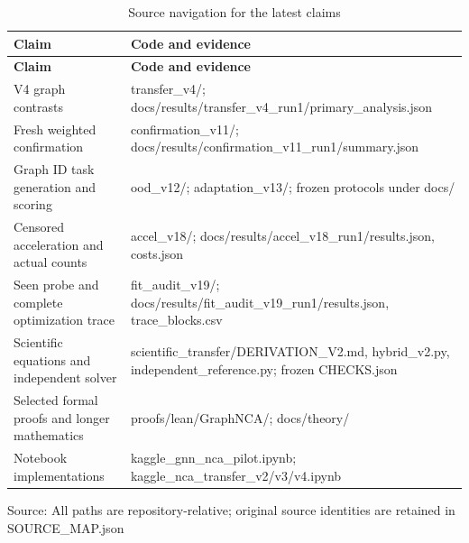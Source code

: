 \documentclass[10pt,letterpaper,twocolumn]{article}
\begin{document}
{\footnotesize\setlength{\tabcolsep}{4pt}\renewcommand{\arraystretch}{1.2}
\begin{longtable}{>{\raggedright\arraybackslash}p{}>{\raggedright\arraybackslash}p{}}
\caption{Source navigation for the latest claims}\\\toprule
\textbf{Claim} & \textbf{Code and evidence}\\
\midrule\endfirsthead
\toprule
\textbf{Claim} & \textbf{Code and evidence}\\
\midrule\endhead
\bottomrule\endlastfoot
V4 graph contrasts & transfer\_\allowbreak{}v4/\allowbreak{}; docs/\allowbreak{}results/\allowbreak{}transfer\_\allowbreak{}v4\_\allowbreak{}run1/\allowbreak{}primary\_\allowbreak{}analysis.json\\
Fresh weighted confirmation & confirmation\_\allowbreak{}v11/\allowbreak{}; docs/\allowbreak{}results/\allowbreak{}confirmation\_\allowbreak{}v11\_\allowbreak{}run1/\allowbreak{}summary.json\\
Graph ID task generation and scoring & ood\_\allowbreak{}v12/\allowbreak{}; adaptation\_\allowbreak{}v13/\allowbreak{}; frozen protocols under docs/\allowbreak{}\\
Censored acceleration and actual counts & accel\_\allowbreak{}v18/\allowbreak{}; docs/\allowbreak{}results/\allowbreak{}accel\_\allowbreak{}v18\_\allowbreak{}run1/\allowbreak{}results.json, costs.json\\
Seen probe and complete optimization trace & fit\_\allowbreak{}audit\_\allowbreak{}v19/\allowbreak{}; docs/\allowbreak{}results/\allowbreak{}fit\_\allowbreak{}audit\_\allowbreak{}v19\_\allowbreak{}run1/\allowbreak{}results.json, trace\_\allowbreak{}blocks.csv\\
Scientific equations and independent solver & scientific\_\allowbreak{}transfer/\allowbreak{}DERIVATION\_\allowbreak{}V2.md, hybrid\_\allowbreak{}v2.py, independent\_\allowbreak{}reference.py; frozen CHECKS.json\\
Selected formal proofs and longer mathematics & proofs/\allowbreak{}lean/\allowbreak{}GraphNCA/\allowbreak{}; docs/\allowbreak{}theory/\allowbreak{}\\
Notebook implementations & kaggle\_\allowbreak{}gnn\_\allowbreak{}nca\_\allowbreak{}pilot.ipynb; kaggle\_\allowbreak{}nca\_\allowbreak{}transfer\_\allowbreak{}v2/\allowbreak{}v3/\allowbreak{}v4.ipynb\\
\end{longtable}}
{\footnotesize Source: All paths are repository-relative; original source identities are retained in SOURCE\_\allowbreak{}MAP.json\par}
\end{document}
